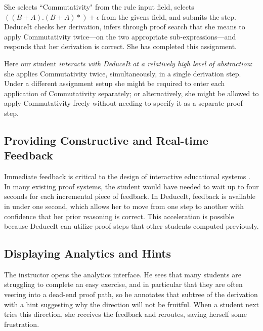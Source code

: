 \documentclass{sigchi}
\begin{document}
She selects ``Commutativity" from the rule input field, selects $((B+A).(B+A)*)+\epsilon$ from the givens field, and submits the step. DeduceIt checks her derivation, infers through proof search that she means to apply Commutativity twice---on the two appropriate sub-expressions---and responds that her derivation is correct. She has completed this assignment.

Here our student \textit{interacts with DeduceIt at a relatively high level of abstraction}: she applies Commutativity twice, simultaneously, in a single derivation step. Under a different assignment setup she might be required to enter each application of Commutativity separately; or alternatively, she might be allowed to apply Commutativity freely without needing to specify it as a separate proof step. %

\subsection{Providing Constructive and Real-time Feedback}
Immediate feedback is critical to the design of interactive educational systems \cite{locusoffeedback}. In many existing proof systems, the student would have needed to wait up to four seconds for each incremental piece of feedback. In DeduceIt, feedback is available in under one second, which allows her to move from one step to another with confidence that her prior reasoning is correct. This acceleration is possible because DeduceIt can utilize proof steps that other students computed previously.

\subsection{Displaying Analytics and Hints}
The instructor opens the analytics interface. He sees that many students are struggling to complete an easy exercise, and in particular that they are often veering into a dead-end proof path, so he annotates that subtree of the derivation with a hint suggesting why the direction will not be fruitful. When a student next tries this direction, she receives the feedback and reroutes, saving herself some frustration.
\end{document}
